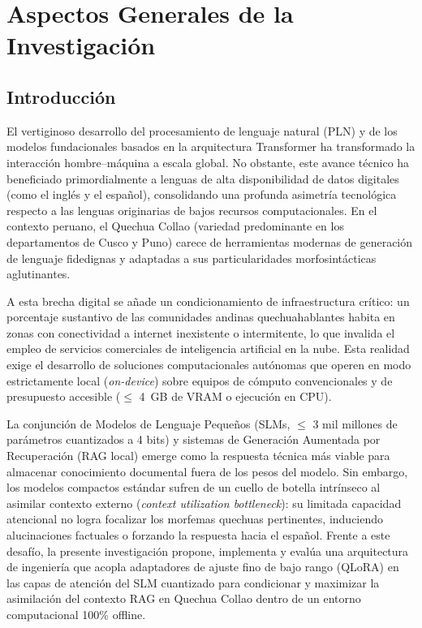 \newpage


\section{Aspectos Generales de la Investigación}

\subsection{Introducción}
El vertiginoso desarrollo del procesamiento de lenguaje natural (PLN) y de los modelos fundacionales basados en la arquitectura Transformer ha transformado la interacción hombre--máquina a escala global. No obstante, este avance técnico ha beneficiado primordialmente a lenguas de alta disponibilidad de datos digitales (como el inglés y el español), consolidando una profunda asimetría tecnológica respecto a las lenguas originarias de bajos recursos computacionales. En el contexto peruano, el Quechua Collao (variedad predominante en los departamentos de Cusco y Puno) carece de herramientas modernas de generación de lenguaje fidedignas y adaptadas a sus particularidades morfosintácticas aglutinantes.

A esta brecha digital se añade un condicionamiento de infraestructura crítico: un porcentaje sustantivo de las comunidades andinas quechuahablantes habita en zonas con conectividad a internet inexistente o intermitente, lo que invalida el empleo de servicios comerciales de inteligencia artificial en la nube. Esta realidad exige el desarrollo de soluciones computacionales autónomas que operen en modo estrictamente local (\textit{on-device}) sobre equipos de cómputo convencionales y de presupuesto accesible ($\le$ 4~GB de VRAM o ejecución en CPU).

La conjunción de Modelos de Lenguaje Pequeños (SLMs, $\le$ 3 mil millones de parámetros cuantizados a 4 bits) y sistemas de Generación Aumentada por Recuperación (RAG local) emerge como la respuesta técnica más viable para almacenar conocimiento documental fuera de los pesos del modelo. Sin embargo, los modelos compactos estándar sufren de un cuello de botella intrínseco al asimilar contexto externo (\textit{context utilization bottleneck}): su limitada capacidad atencional no logra focalizar los morfemas quechuas pertinentes, induciendo alucinaciones factuales o forzando la respuesta hacia el español. Frente a este desafío, la presente investigación propone, implementa y evalúa una arquitectura de ingeniería que acopla adaptadores de ajuste fino de bajo rango (QLoRA) en las capas de atención del SLM cuantizado para condicionar y maximizar la asimilación del contexto RAG en Quechua Collao dentro de un entorno computacional 100\% offline.

